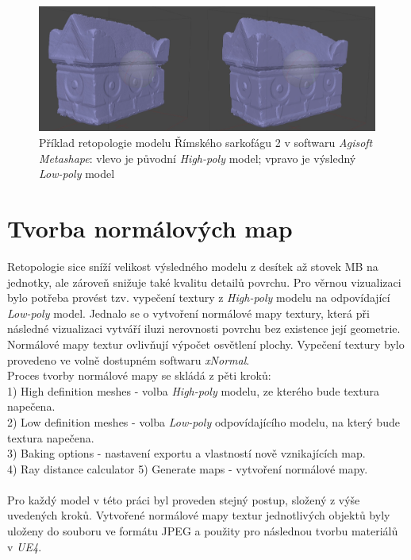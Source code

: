 \documentclass[a4paper, 12pt]{report}
\begin{document}
\begin{figure}[h!]
	\centering
	\includegraphics[width=16cm]{retopologie_agisoft.jpg}
	\caption{Příklad retopologie modelu Římského sarkofágu 2 v softwaru \textit{Agisoft Metashape}: vlevo je původní \textit{High-poly} model; vpravo je výsledný \textit{Low-poly} model}
\end{figure}

\section{Tvorba normálových map}
Retopologie sice sníží velikost výsledného modelu z desítek až stovek MB na jednotky, ale zároveň snižuje také kvalitu detailů povrchu. Pro věrnou vizualizaci bylo potřeba provést tzv. vypečení textury z \textit{High-poly} modelu na odpovídající \textit{Low-poly} model. Jednalo se o vytvoření normálové mapy textury, která při následné vizualizaci vytváří iluzi nerovnosti povrchu bez existence její geometrie. Normálové mapy textur ovlivňují výpočet osvětlení plochy. Vypečení textury bylo provedeno ve volně dostupném softwaru \textit{xNormal}. \\
Proces tvorby normálové mapy se skládá z pěti kroků:\\
1) High definition meshes - volba \textit{High-poly} modelu, ze kterého bude textura napečena. \\
2) Low definition meshes - volba \textit{Low-poly} odpovídajícího modelu, na který bude textura napečena.\\
3) Baking options - nastavení exportu a vlastností nově vznikajících map.\\
4) Ray distance calculator
5) Generate maps - vytvoření normálové mapy.\\
\\
Pro každý model v této práci byl proveden stejný postup, složený z výše uvedených kroků. Vytvořené normálové mapy textur jednotlivých objektů byly uloženy do souboru ve formátu JPEG a použity pro následnou tvorbu materiálů v \textit{UE4}. 
\end{document}
